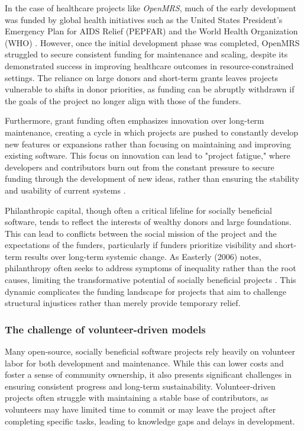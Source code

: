 \begin{refsection}
In the case of healthcare projects like \textit{OpenMRS}, much of the early development was funded by global health initiatives such as the United States President's Emergency Plan for AIDS Relief (PEPFAR) and the World Health Organization (WHO) \cite[pp.~153-156]{tierney2010}. However, once the initial development phase was completed, OpenMRS struggled to secure consistent funding for maintenance and scaling, despite its demonstrated success in improving healthcare outcomes in resource-constrained settings. The reliance on large donors and short-term grants leaves projects vulnerable to shifts in donor priorities, as funding can be abruptly withdrawn if the goals of the project no longer align with those of the funders.

Furthermore, grant funding often emphasizes innovation over long-term maintenance, creating a cycle in which projects are pushed to constantly develop new features or expansions rather than focusing on maintaining and improving existing software. This focus on innovation can lead to "project fatigue," where developers and contributors burn out from the constant pressure to secure funding through the development of new ideas, rather than ensuring the stability and usability of current systems \cite[pp.~44-46]{easterly2006}.

Philanthropic capital, though often a critical lifeline for socially beneficial software, tends to reflect the interests of wealthy donors and large foundations. This can lead to conflicts between the social mission of the project and the expectations of the funders, particularly if funders prioritize visibility and short-term results over long-term systemic change. As Easterly (2006) notes, philanthropy often seeks to address symptoms of inequality rather than the root causes, limiting the transformative potential of socially beneficial projects \cite[pp.~50-52]{easterly2006}. This dynamic complicates the funding landscape for projects that aim to challenge structural injustices rather than merely provide temporary relief.

\subsubsection{The challenge of volunteer-driven models}

Many open-source, socially beneficial software projects rely heavily on volunteer labor for both development and maintenance. While this can lower costs and foster a sense of community ownership, it also presents significant challenges in ensuring consistent progress and long-term sustainability. Volunteer-driven projects often struggle with maintaining a stable base of contributors, as volunteers may have limited time to commit or may leave the project after completing specific tasks, leading to knowledge gaps and delays in development.


\end{refsection}
